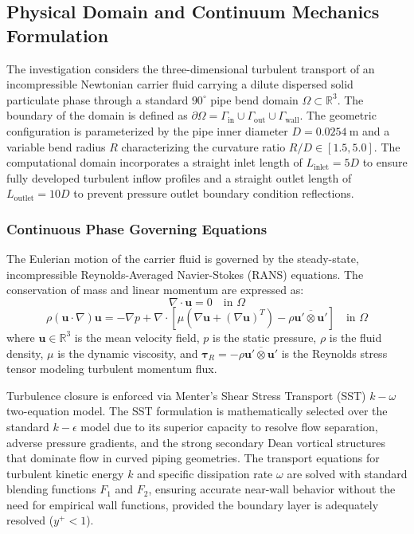 \documentclass{article}
\begin{document}
\subsection{Physical Domain and Continuum Mechanics Formulation}
\label{sec:continuum_mechanics}

The investigation considers the three-dimensional turbulent transport of an incompressible Newtonian carrier fluid carrying a dilute dispersed solid particulate phase through a standard $90^\circ$ pipe bend domain $\Omega \subset \mathbb{R}^3$. The boundary of the domain is defined as $\partial\Omega = \Gamma_{\text{in}} \cup \Gamma_{\text{out}} \cup \Gamma_{\text{wall}}$. The geometric configuration is parameterized by the pipe inner diameter $D = 0.0254~\text{m}$ and a variable bend radius $R$ characterizing the curvature ratio $R/D \in [1.5, 5.0]$. The computational domain incorporates a straight inlet length of $L_{\text{inlet}} = 5D$ to ensure fully developed turbulent inflow profiles and a straight outlet length of $L_{\text{outlet}} = 10D$ to prevent pressure outlet boundary condition reflections.

\subsubsection{Continuous Phase Governing Equations}
The Eulerian motion of the carrier fluid is governed by the steady-state, incompressible Reynolds-Averaged Navier-Stokes (RANS) equations. The conservation of mass and linear momentum are expressed as:
\begin{equation}
    \nabla \cdot \mathbf{u} = 0 \quad \text{in } \Omega
    \label{eq:rans_continuity}
\end{equation}
\begin{equation}
    \rho (\mathbf{u} \cdot \nabla) \mathbf{u} = -\nabla p + \nabla \cdot \left[ \mu \left( \nabla \mathbf{u} + (\nabla \mathbf{u})^T \right) - \rho \overline{\mathbf{u}' \otimes \mathbf{u}'} \right] \quad \text{in } \Omega
    \label{eq:rans_momentum}
\end{equation}
where $\mathbf{u} \in \mathbb{R}^3$ is the mean velocity field, $p$ is the static pressure, $\rho$ is the fluid density, $\mu$ is the dynamic viscosity, and $\bm{\tau}_R = -\rho \overline{\mathbf{u}' \otimes \mathbf{u}'}$ is the Reynolds stress tensor modeling turbulent momentum flux.

Turbulence closure is enforced via Menter's Shear Stress Transport (SST) $k-\omega$ two-equation model. The SST formulation is mathematically selected over the standard $k-\epsilon$ model due to its superior capacity to resolve flow separation, adverse pressure gradients, and the strong secondary Dean vortical structures that dominate flow in curved piping geometries. The transport equations for turbulent kinetic energy $k$ and specific dissipation rate $\omega$ are solved with standard blending functions $F_1$ and $F_2$, ensuring accurate near-wall behavior without the need for empirical wall functions, provided the boundary layer is adequately resolved ($y^+ < 1$).
\end{document}
